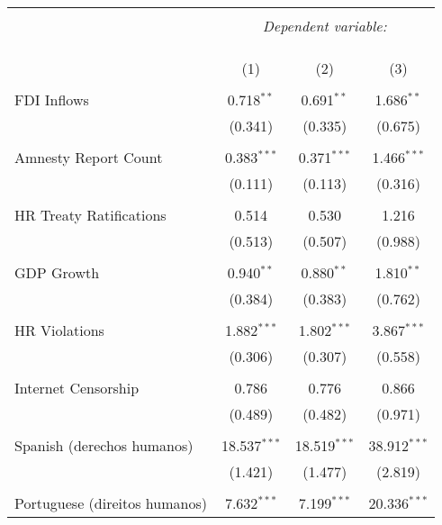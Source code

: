 
\begin{table}[!htbp] \centering 
  \caption{} 
  \label{} 
\begin{tabular}{@{\extracolsep{5pt}}lccc} 
\\[-1.8ex]\hline 
\hline \\[-1.8ex] 
 & \multicolumn{3}{c}{\textit{Dependent variable:}} \\ 
\cline{2-4} 
\\[-1.8ex] & \multicolumn{3}{c}{ } \\ 
\\[-1.8ex] & (1) & (2) & (3)\\ 
\hline \\[-1.8ex] 
 FDI Inflows & 0.718$^{**}$ & 0.691$^{**}$ & 1.686$^{**}$ \\ 
  & (0.341) & (0.335) & (0.675) \\ 
  & & & \\ 
 Amnesty Report Count & 0.383$^{***}$ & 0.371$^{***}$ & 1.466$^{***}$ \\ 
  & (0.111) & (0.113) & (0.316) \\ 
  & & & \\ 
 HR Treaty Ratifications & 0.514 & 0.530 & 1.216 \\ 
  & (0.513) & (0.507) & (0.988) \\ 
  & & & \\ 
 GDP Growth & 0.940$^{**}$ & 0.880$^{**}$ & 1.810$^{**}$ \\ 
  & (0.384) & (0.383) & (0.762) \\ 
  & & & \\ 
 HR Violations & 1.882$^{***}$ & 1.802$^{***}$ & 3.867$^{***}$ \\ 
  & (0.306) & (0.307) & (0.558) \\ 
  & & & \\ 
 Internet Censorship & 0.786 & 0.776 & 0.866 \\ 
  & (0.489) & (0.482) & (0.971) \\ 
  & & & \\ 
 Spanish (derechos humanos) & 18.537$^{***}$ & 18.519$^{***}$ & 38.912$^{***}$ \\ 
  & (1.421) & (1.477) & (2.819) \\ 
  & & & \\ 
 Portuguese (direitos humanos) & 7.632$^{***}$ & 7.199$^{***}$ & 20.336$^{***}$ \\ 

\end{tabular}
\end{table}
